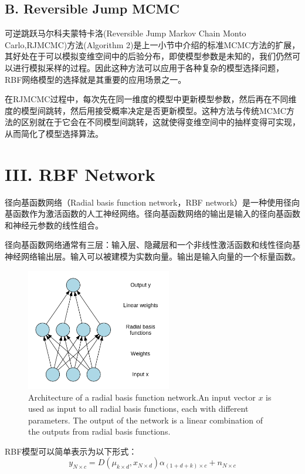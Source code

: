 \documentclass[twocolumn]{article}
\begin{document}
\subsection*{B. Reversible Jump MCMC}

可逆跳跃马尔科夫蒙特卡洛(Reversible Jump Markov Chain Monto Carlo,RJMCMC)方法(Algorithm 2)\cite{doi:10.1093/biomet/82.4.711}\cite{Andrieu99robustfull}是上一小节中介绍的标准MCMC方法的扩展，其好处在于可以模拟变维空间中的后验分布，即使模型参数是未知的，我们仍然可以进行模拟采样的过程。因此这种方法可以应用于各种复杂的模型选择问题，RBF网络模型的选择就是其重要的应用场景之一。

在RJMCMC过程中，每次先在同一维度的模型中更新模型参数，然后再在不同维度的模型间跳转，然后用接受概率决定是否更新模型。这种方法与传统MCMC方法的区别就在于它会在不同模型间跳转，这就使得变维空间中的抽样变得可实现，从而简化了模型选择算法。

\section*{\centering III. RBF Network}

径向基函数网络（Radial basis function network，RBF network）是一种使用径向基函数作为激活函数的人工神经网络。径向基函数网络的输出是输入的径向基函数和神经元参数的线性组合。

径向基函数网络通常有三层：输入层、隐藏层和一个非线性激活函数和线性径向基神经网络输出层。输入可以被建模为实数向量。输出是输入向量的一个标量函数。

\begin{figure}[H]
  \centering
  \includegraphics[width=2.5in]{465px-Radial_funktion_network.png}
  \caption{Architecture of a radial basis function network.An input vector $x$ is used as input to all radial basis functions, each with different parameters. The output of the network is a linear combination of the outputs from radial basis functions.}
\end{figure}

RBF模型可以简单表示为以下形式\cite{DBLP}：$$y_{N\times c} = D(\mu_{k\times d}, x_{N\times d})\alpha_{(1+d+k)\times c} + n_{N\times c}$$
\end{document}
